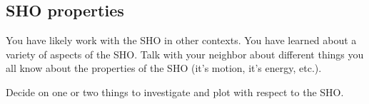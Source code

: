 \documentclass[letterpaper,10pt,english]{jupyterBook}
\begin{document}
\subsection{SHO properties}
\label{\detokenize{content/1_mechanics/sho/notes-SHO:sho-properties}}
\sphinxAtStartPar
You have likely work with the SHO in other contexts. You have learned about a variety of aspects of the SHO. Talk with your neighbor about different things you all know about the properties of the SHO (it’s motion, it’s energy, etc.).

\sphinxAtStartPar
{}

\sphinxAtStartPar
Decide on one or two things to investigate and plot with respect to the SHO. 
\end{document}
